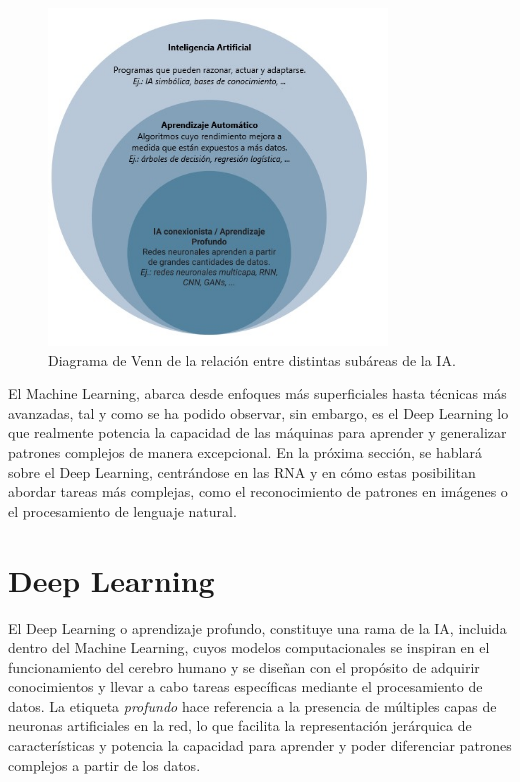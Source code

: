  \begin{figure} [h!]
    \begin{center}
      \includegraphics[width=9cm]{figs/Algoritmos de ML.png}
    \end{center}
    \caption{Diagrama de Venn de la relación entre distintas subáreas de la IA.}
    \label{fig:AlgoritmosML}
\end{figure}
\pagebreak

El Machine Learning, abarca desde enfoques más superficiales hasta técnicas más avanzadas, tal y como se ha podido observar, sin embargo, es el Deep Learning lo que realmente potencia la capacidad de las máquinas para aprender y generalizar patrones complejos de manera excepcional. En la próxima sección, se hablará sobre el Deep Learning, centrándose en las RNA y en cómo estas posibilitan abordar tareas más complejas, como el reconocimiento de patrones en imágenes o el procesamiento de lenguaje natural.

\section{Deep Learning}
\label{sec:DeepLearning} 
El Deep Learning o aprendizaje profundo, constituye una rama de la IA, incluida dentro del Machine Learning, cuyos modelos computacionales se inspiran en el funcionamiento del cerebro humano y se diseñan con el propósito de adquirir conocimientos y llevar a cabo tareas específicas mediante el procesamiento de datos. La etiqueta \textit{profundo} hace referencia a la presencia de múltiples capas de neuronas artificiales en la red, lo que facilita la representación jerárquica de características y potencia la capacidad para aprender y poder diferenciar patrones complejos a partir de los datos.\\

